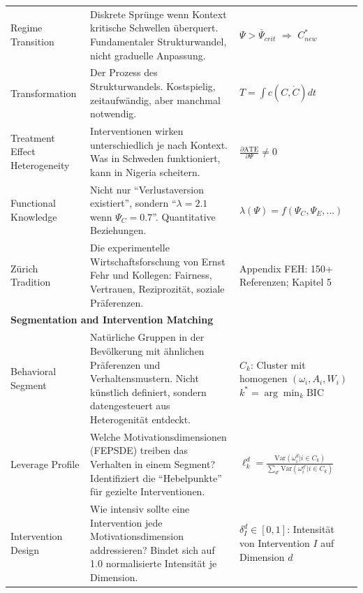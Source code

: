 \begin{center}
\begin{longtable}{@{}p{2.5cm}p{5.2cm}p{5.2cm}@{}}
Regime Transition &
Diskrete Sprünge wenn Kontext kritische Schwellen überquert. Fundamentaler Strukturwandel, nicht graduelle Anpassung. &
$\Psi > \bar{\Psi}_{crit}$ $\Rightarrow$ $C^*_{new}$ \\

Transformation &
Der Prozess des Strukturwandels. Kostspielig, zeitaufwändig, aber manchmal notwendig. &
$T = \int c(C, \dot{C}) dt$ \\

Treatment Effect Heterogeneity &
Interventionen wirken unterschiedlich je nach Kontext. Was in Schweden funktioniert, kann in Nigeria scheitern. &
$\frac{\partial \text{ATE}}{\partial \Psi} \neq 0$ \\

Functional Knowledge &
Nicht nur ``Verlustaversion existiert'', sondern ``$\lambda = 2.1$ wenn $\Psi_C = 0.7$''. Quantitative Beziehungen. &
$\lambda(\Psi) = f(\Psi_C, \Psi_E, ...)$ \\

Zürich Tradition &
Die experimentelle Wirtschaftsforschung von Ernst Fehr und Kollegen: Fairness, Vertrauen, Reziprozität, soziale Präferenzen. &
Appendix FEH: 150+ Referenzen; \newline Kapitel 5 \\

\midrule
\multicolumn{3}{l}{\cellcolor{orange!10}\textbf{Segmentation and Intervention Matching}} \\
\midrule

Behavioral Segment &
Natürliche Gruppen in der Bevölkerung mit ähnlichen Präferenzen und Verhaltensmustern. Nicht künstlich definiert, sondern datengesteuert aus Heterogenität entdeckt. &
$C_k$: Cluster mit homogenen $(\omega_i, A_i, W_i)$ \newline $k^* = \arg\min_k \text{BIC}$ \\

Leverage Profile &
Welche Motivationsdimensionen (FEPSDE) treiben das Verhalten in einem Segment? Identifiziert die ``Hebelpunkte'' für gezielte Interventionen. &
$\ell_k^d = \frac{\text{Var}(\omega_i^d | i \in C_k)}{\sum_{d'} \text{Var}(\omega_i^{d'} | i \in C_k)}$ \\

Intervention Design &
Wie intensiv sollte eine Intervention jede Motivationsdimension addressieren? Bindet sich auf 1.0 normalisierte Intensität je Dimension. &
$\delta_I^d \in [0,1]$: Intensität von Intervention $I$ auf Dimension $d$ \\


\end{longtable}
\end{center}
